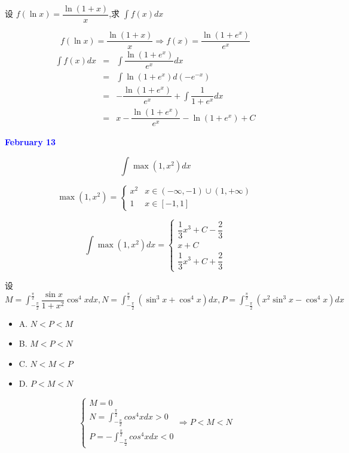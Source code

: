 \begin{example}[][Exam: 28.2.10]
	设 $f(\ln x)=\dfrac{\ln(1+x)}{x}$,求 $\int f(x)dx$
\end{example}
\begin{solution}

	$$f(\ln x) = \dfrac{\ln(1+x)}{x}\Rightarrow f(x) = \dfrac{\ln(1+e^{x})}{e^{x}}$$
	\begin{eqnarray*}
		\int f(x)dx & = & \int \dfrac{\ln(1+e^{x})}{e^{x}}dx\\
		  			& = & \int \ln(1+e^{x})d(-e^{-x})\\
		  			& = & -\dfrac{\ln(1+e^{x})}{e^{x}} + \int \dfrac{1}{1+e^{x}}dx\\
					& = & x - \dfrac{\ln(1+e^{x})}{e^{x}} - \ln(1+e^{x}) + C 
	\end{eqnarray*}
\end{solution}

\textcolor{blue}{\textbf{February 13}}

\begin{example}[][Exam: 28.2.11]
	$$\int \max(1,x^{2})dx$$
\end{example}
\begin{solution}
	
	$$\max(1,x^{2}) = 
	\begin{cases}
		x^{2} & x\in(-\infty,-1)\cup(1,+\infty)\\
		1 & x\in[-1,1]
	\end{cases}$$

	$$\int \max(1,x^{2}) dx = 
	\begin{cases}
		\dfrac{1}{3}x^{3} + C -\dfrac{2}{3}\\
		x + C\\
		\dfrac{1}{3}x^{3} + C +\dfrac{2}{3}
	\end{cases}$$
\end{solution}

\begin{example}[][Exam: 28.2.12]
	设 $M=\int_{-\frac{\pi}{2}}^{\frac{\pi}{2}}\dfrac{\sin x}{1+x^{2}}\cos^{4}xdx,N=\int_{-\frac{\pi}{2}}^{\frac{\pi}{2}}(\sin^{3}x+\cos^{4}x)dx,P=\int_{-\frac{\pi}{2}}^{\frac{\pi}{2}}(x^{2}\sin^{3}x-\cos^{4}x)dx$
\begin{itemize}
	\item A. $N<P<M$
	\item B. $M<P<N$
	\item C. $N<M<P$
	\item D. $P<M<N$
\end{itemize}
\end{example}
\begin{solution}
	$$\begin{cases}
	  M = 0\\
	  N = \int_{-\frac{\pi}{2}}^{\frac{\pi}{2}}cos^{4}xdx > 0\\
	  P = -\int_{-\frac{\pi}{2}}^{\frac{\pi}{2}}cos^{4}xdx < 0
	\end{cases}\Rightarrow P < M < N$$
\end{solution}

